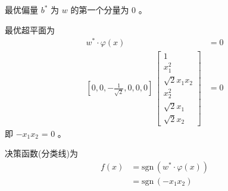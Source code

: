	最优偏量 $b^*$ 为 $w$ 的第一个分量为 $0$ 。
	\par
	最优超平面为
	\begin{align*}
	 w^* \cdot \varphi(x) &= 0 \\
	 \left[ 0,0,-\frac{1}{\sqrt{2}},0,0,0 \right] \,
	\begin{bmatrix}
	1 \\
	x_1^2 \\
	\sqrt{2} x_1 x_2 \\
	x_2^2 \\
	\sqrt{2} x_1 \\
	\sqrt{2} x_2
	\end{bmatrix}
	&= 0
	\end{align*}
	即 $-x_1 x_2$ = 0 。
	\par
	决策函数(分类线)为
	\begin{align*}
	f(x) &= \mathrm{sgn} \, (w^* \cdot \varphi(x)) \\
	     &= \mathrm{sgn} \, (-x_1 x_2)
	\end{align*}




% 
